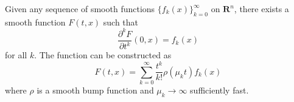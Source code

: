 Given any sequence of smooth functions $\{f_k(x)\}_{k=0}^{\infty}$ on $\mathbf{R}^n$, there exists a smooth function $F(t, x)$ such that
$$\frac{\partial^k F}{\partial t^k}(0, x) = f_k(x)$$
for all $k$. The function can be constructed as
$$F(t, x) = \sum_{k=0}^{\infty} \frac{t^k}{k!} \rho(\mu_k t) f_k(x)$$
where $\rho$ is a smooth bump function and $\mu_k \to \infty$ sufficiently fast.
